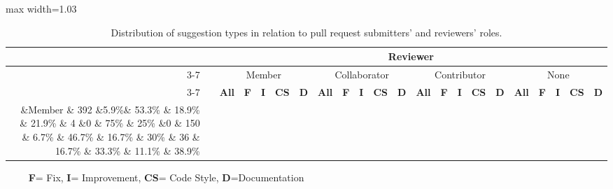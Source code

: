 \begin{table*}[t]
        \caption{Distribution of suggestion types in relation to pull request submitters' and reviewers' roles.}
        \begin{adjustbox}{max width=1.03\textwidth}
        \setlength{\tabcolsep}{2.1pt}
    \begin{tabular}{rl rrrrr| rrrrr| rrrrr| rrrrr}
            \toprule
            &&\multicolumn{20}{c}{\textbf{ Reviewer}}\\
            \cmidrule{3-7}\cmidrule{8-12}\cmidrule{13-17}\cmidrule{18-22}
            &&\multicolumn{5}{c}{Member}&\multicolumn{5}{c}{Collaborator}&\multicolumn{5}{c}{Contributor}&\multicolumn{5}{c}{None}\\
            \cmidrule{3-7}\cmidrule{8-12}\cmidrule{13-17}\cmidrule{18-22}
                 &&\cellcolor{gri}\textbf{All}&\textbf{F}&\textbf{I}&\textbf{CS}&\textbf{D}&\cellcolor{gri}\textbf{All}&\textbf{F}&\textbf{I}&\textbf{CS}&\textbf{D}&\cellcolor{gri}\textbf{All}&\textbf{F}&\textbf{I}&\textbf{CS}&\textbf{D}&\cellcolor{gri}\textbf{All}&\textbf{F}&\textbf{I}&\textbf{CS}&\textbf{D}\\
                 \midrule
                 
        \parbox[t]{2mm}{}&Member & 392 &5.9\%& 53.3\% & 18.9\% & 21.9\% & 4 &0 & 75\% & 25\% &0 & 150 & 6.7\% & 46.7\% & 16.7\% & 30\% & 36 & 16.7\% & 33.3\% & 11.1\% & 38.9\%\\
        &Collaborator&3&0 & 66.7\% &0 & 33.3\% & 0 &0 &0 &0 &0 & 0 &0 &0 &0 &0 & 4 &0 &0 &0 & 100\%\\
        &Contributor&657&9.3\% & 51.3\% & 19.3\% & 20.1\% & 9 & 11.1\% & 66.7\% & 11.1\% & 11.1\% & 416 & 7.5\% & 44\% & 13\% & 35.6\% & 14 & 7.1\% & 50\% & 7.1\% & 35.7\%\\
        &None&54&11.1\% & 38.9\% & 11.1\% & 38.9\% & 2 &0 &0 &0 & 100\% & 24 & 4.2\% & 20.8\% & 37.5\% & 37.5\% & 10 & 20\% & 60\% & 20\% &0\\
        \bottomrule
    \end{tabular}
\end{adjustbox}

\begin{flushleft} 
$\quad\quad$ \textbf{F}= Fix, \textbf{I}= Improvement, \textbf{CS}= Code Style, \textbf{D}=Documentation 
\end{flushleft} 

\label{tab:roles_sugg_type}
\end{table*}


